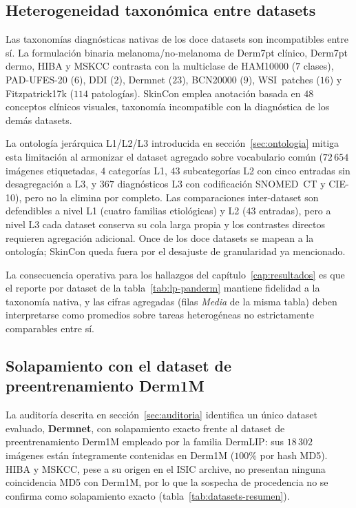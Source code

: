 \subsection{Heterogeneidad taxonómica entre datasets}
\label{sec:lim-taxonomia}

Las taxonomías diagnósticas nativas de los doce datasets son
incompatibles entre sí. La formulación binaria
melanoma/no-melanoma de Derm7pt clínico, Derm7pt dermo, HIBA y
MSKCC contrasta con la multiclase de HAM10000 ($7$ clases),
PAD-UFES-20 ($6$), DDI ($2$), Dermnet ($23$), BCN20000
($9$), WSI~patches ($16$) y Fitzpatrick17k
($114$ patologías). SkinCon emplea anotación basada en
$48$ conceptos clínicos visuales, taxonomía incompatible con la
diagnóstica de los demás datasets.

La ontología jerárquica L1/L2/L3 introducida en
sección~\ref{sec:ontologia} mitiga esta limitación al armonizar el
dataset agregado sobre vocabulario común
($72\,654$ imágenes etiquetadas, $4$ categorías L1, $43$
subcategorías L2 con cinco entradas sin desagregación a L3, y
$367$ diagnósticos L3 con codificación SNOMED~CT y CIE-10), pero
no la elimina por completo. Las comparaciones inter-dataset son
defendibles a nivel L1 (cuatro familias etiológicas) y L2
($43$ entradas), pero a nivel L3 cada dataset conserva su cola
larga propia y los contrastes directos requieren agregación
adicional. Once de los doce datasets se mapean a la ontología;
SkinCon queda fuera por el desajuste de granularidad ya
mencionado.

La consecuencia operativa para los hallazgos del
capítulo~\ref{cap:resultados} es que el reporte por dataset de la
tabla~\ref{tab:lp-panderm} mantiene fidelidad a la taxonomía
nativa, y las cifras agregadas (filas \emph{Media} de la misma
tabla) deben interpretarse como promedios sobre tareas heterogéneas
no estrictamente comparables entre sí.

\subsection{Solapamiento con el dataset de preentrenamiento Derm1M}
\label{sec:lim-leakage}

La auditoría descrita en sección~\ref{sec:auditoria} identifica un
único dataset evaluado, \textbf{Dermnet}, con solapamiento exacto
frente al dataset de preentrenamiento Derm1M empleado por la familia
DermLIP: sus $18\,302$ imágenes están íntegramente contenidas en
Derm1M ($100\%$ por hash MD5). HIBA y MSKCC, pese a su origen en el
ISIC archive, no presentan ninguna coincidencia MD5 con Derm1M, por
lo que la sospecha de procedencia no se confirma como solapamiento
exacto (tabla~\ref{tab:datasets-resumen}).

